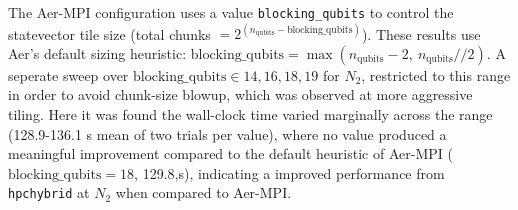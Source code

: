 The Aer-MPI configuration uses a value \texttt{blocking_qubits} to control the statevector tile size (total chunks $= 2^{(n_{\text{qubits}} - \text{blocking_qubits})}$). 
These results use Aer's default sizing heuristic: $\text{blocking_qubits} = \max(n_{\text{qubits}}-2,\ n_{\text{qubits}}//2)$. 
A seperate sweep over $\text{blocking_qubits} \in {14, 16, 18, 19}$ for $N_2$, restricted to this range in order to avoid chunk-size blowup, 
which was observed at more aggressive tiling. Here it was found the wall-clock time varied marginally across the range (128.9-136.1 s mean of two trials per value), where no value
produced a meaningful improvement compared to the default heuristic of Aer-MPI ($\text{blocking_qubits}=18$, 129.8,s), indicating a improved performance from \texttt{hpchybrid} at $N_2$ when 
compared to Aer-MPI. 



 

